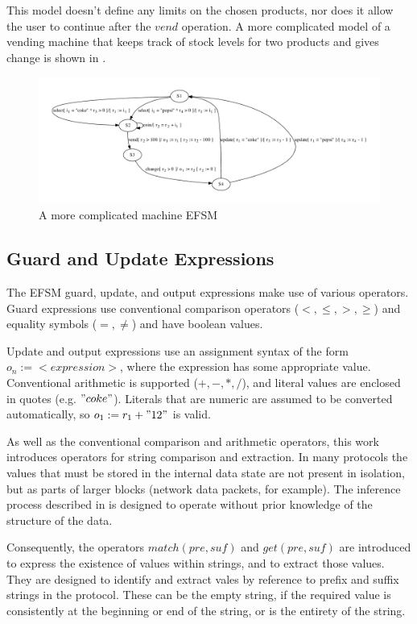 This model doesn't define any limits on the chosen products, nor does it allow the user to continue after the $vend$ operation. A more complicated model of a vending machine that keeps track of stock levels for two products and gives change is shown in .

\begin{figure}[here]
\begin{center}
\includegraphics[width=13cm]{vend-complicated.pdf}
\caption{A more complicated machine EFSM}
\label{fig:vendcomplicated}
\end{center}
\end{figure}

\subsection{Guard and Update Expressions}
\label{Expressions}

The EFSM guard, update, and output expressions make use of various operators. Guard expressions use conventional comparison operators ($<, \leq, >, \geq$) and equality symbols ($=, \neq$) and have boolean values.

Update and output expressions use an assignment syntax of the form $o_n := <expression>$, where the expression has some appropriate value. Conventional arithmetic is supported ($+,-,*,/$), and literal values are enclosed in quotes (e.g. $"coke"$). Literals that are numeric are assumed to be converted automatically, so $o_1 := r_1 + "12"$ is valid. 

As well as the conventional comparison and arithmetic operators, this work introduces operators for string comparison and extraction. In many protocols the values that must be stored in the internal data state are not present in isolation, but as parts of larger blocks (network data packets, for example). The inference process described in  is designed to operate without prior knowledge of the structure of the data. 

Consequently, the operators $match(pre,suf)$ and $get(pre,suf)$ are introduced to express the existence of values within strings, and to extract those values. They are designed to identify and extract vales by reference to prefix and suffix strings in the protocol. These can be the empty string, if the required value is consistently at the beginning or end of the string, or is the entirety of the string. 

